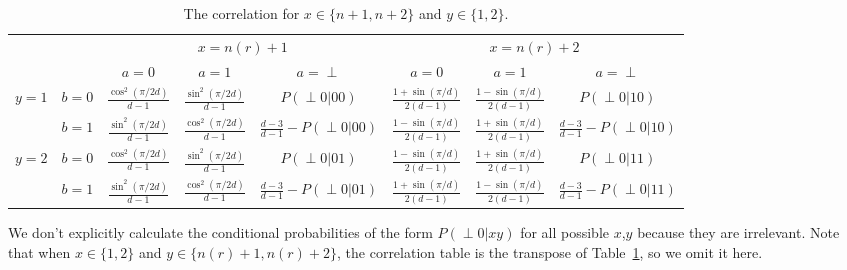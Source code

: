\documentclass[11pt,letterpaper]{article}
\newcommand{\1}{\mathbb{1}}
\newcommand{\nr}{n(r)}
\newcommand{\pr}[2]{P(#1|#2)}
\theoremstyle{definition}
\begin{document}
\begin{table}[H]
\begin{center}
\begin{tabular}{|c|c||c|c|c|c|c|c|}
\hline
\multicolumn{2}{|c|}{} &
\multicolumn{3}{|c|}{$x=\nr+1$}&
\multicolumn{3}{|c|}{$x=\nr+2$} \\
\cline{3-8}
\multicolumn{2}{|c|}{} &
$a = 0$ & $a=1$ & $a=\perp$ &
$a = 0$ & $a=1$ & $a=\perp$\\
\hline
\hline
\multirow{2}{*}{$y = 1$} & $b=0$ & $\frac{\cos^2(\pi/2d)}{d-1}$ & $\frac{\sin^2(\pi/2d)}{d-1}$ & \small $\pr{\perp0}{00}$ 
& $\frac{1+\sin(\pi/d)}{2(d-1)}$ & $\frac{1-\sin(\pi/d)}{2(d-1)}$ & \small  $\pr{\perp0}{10}$ \\
\cline{2-8}
&$b=1$ & $\frac{\sin^2(\pi/2d)}{d-1}$ & $\frac{\cos^2(\pi/2d)}{d-1}$ & $\frac{d-3}{d-1}-\pr{\perp0}{00}$ 
&  $\frac{1-\sin(\pi/d)}{2(d-1)}$ & $\frac{1+\sin(\pi/d)}{2(d-1)}$ & \small $\frac{d-3}{d-1} - \pr{\perp0}{10}$  \\
\hline
\multirow{2}{*}{$y = 2$} & $b=0$ & $\frac{\cos^2(\pi/2d)}{d-1}$ & $\frac{\sin^2(\pi/2d)}{d-1}$ & \small $\pr{\perp0}{01}$ & 
$ \frac{1-\sin(\pi/d)}{2(d-1)}$ & $ \frac{1+\sin(\pi/d)}{2(d-1)}$ & \small $\pr{\perp 0}{11}$  \\
\cline{2-8}
&$b=1$ & $\frac{\sin^2(\pi/2d)}{d-1}$ & $\frac{\cos^2(\pi/2d)}{d-1}$ & \small $\frac{d-3}{d-1}-\pr{\perp0}{01}$ &  
$ \frac{1+\sin(\pi/d)}{2(d-1)}$ & $ \frac{1-\sin(\pi/d)}{2(d-1)}$ & \small $\frac{d-3}{d-1}- \pr{\perp 0}{11}$ \\
\hline
\end{tabular}
\end{center}
\caption{The correlation for $x \in \{n+1, n+2\}$ and $y \in \{1,2\}$.}
\label{tb:chsh}
\end{table}
We don't explicitly calculate the conditional probabilities of the form $\pr{\perp 0}{xy}$ for all possible $x$,$y$ 
because they are irrelevant.
Note that when $x \in \{1,2\}$ and $y \in \{\nr+1, \nr+2\}$, the correlation table is 
the transpose of Table~\ref{tb:chsh}, so we omit it here.
\end{document}
